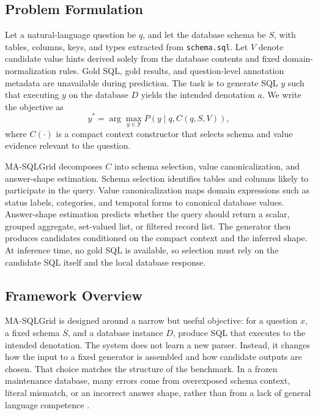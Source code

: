 \documentclass[cmc,article,submit,moreauthors,pdftex]{Definitions/tsp}
\begin{document}
\subsection{Problem Formulation}\label{sect:m1}

Let a natural-language question be $q$, and let the database schema be $S$, with tables, columns, keys, and types extracted from \texttt{schema.sql}. Let $V$ denote candidate value hints derived solely from the database contents and fixed domain-normalization rules. Gold SQL, gold results, and question-level annotation metadata are unavailable during prediction. The task is to generate SQL $y$ such that executing $y$ on the database $D$ yields the intended denotation $a$. We write the objective as
\begin{equation}
y^* = \arg\max_{y \in \mathcal{Y}} P(y \mid q, C(q,S,V)),
\end{equation}
where $C(\cdot)$ is a compact context constructor that selects schema and value evidence relevant to the question.

MA-SQLGrid decomposes $C$ into schema selection, value canonicalization, and answer-shape estimation. Schema selection identifies tables and columns likely to participate in the query. Value canonicalization maps domain expressions such as status labels, categories, and temporal forms to canonical database values. Answer-shape estimation predicts whether the query should return a scalar, grouped aggregate, set-valued list, or filtered record list. The generator then produces candidates conditioned on the compact context and the inferred shape. At inference time, no gold SQL is available, so selection must rely on the candidate SQL itself and the local database response.

\subsection{Framework Overview}\label{sect:m2}

MA-SQLGrid is designed around a narrow but useful objective: for a question $x$, a fixed schema $S$, and a database instance $D$, produce SQL that executes to the intended denotation. The system does not learn a new parser. Instead, it changes how the input to a fixed generator is assembled and how candidate outputs are chosen. That choice matches the structure of the benchmark. In a frozen maintenance database, many errors come from overexposed schema context, literal mismatch, or an incorrect answer shape, rather than from a lack of general language competence \cite{wu2022chains,talaei2024chess,pourreza2023dinsql}.
\end{document}
